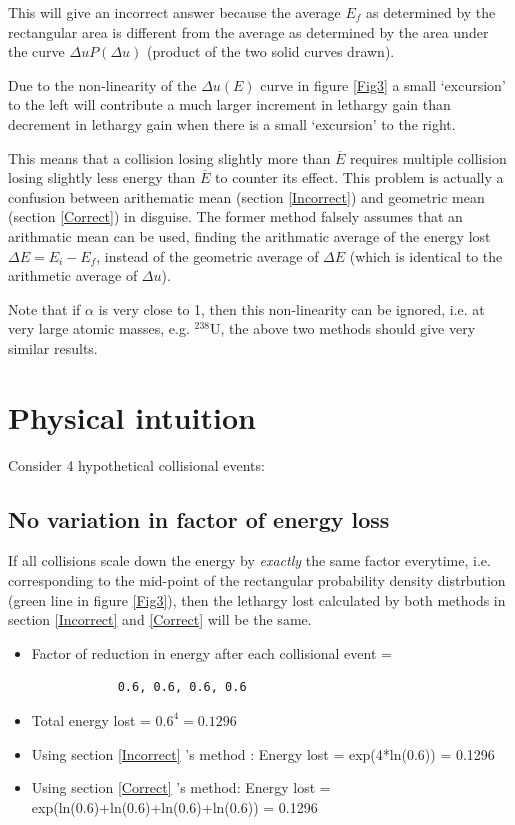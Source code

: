 \documentclass[a4paper, 12pt]{article}
\begin{document}
	This will give an incorrect answer because the average $E_f$ as determined by the rectangular area is different from the average as determined by the area under the curve $ \Delta u P(\Delta u)$ (product of the two solid curves drawn).

	Due to the non-linearity of the $\Delta u(E)$ curve in figure \ref{Fig3} a small `excursion' to the left will contribute a much larger increment in lethargy gain than decrement in lethargy gain when there is a small `excursion' to the right.
	

	This means that a collision losing slightly more than $\overline{E}$ requires multiple collision losing slightly less energy than $\overline{E}$ to counter its effect.
	This problem is actually a confusion between arithematic mean (section \ref{Incorrect}) and geometric mean (section \ref{Correct}) in disguise. The former method falsely assumes that an arithmatic mean can be used, finding the arithmatic average of the energy lost $\Delta E = E_i-E_f$, instead of the geometric average of $\Delta E$ (which is identical to the arithmetic average of $\Delta u$).

	Note that if $\alpha$ is very close to 1, then this non-linearity can be ignored, i.e. at very large atomic masses, e.g. ${}^{238}$U, the above two methods should give very similar results.

\section{Physical intuition}
	Consider 4 hypothetical collisional events:

	\subsection{No variation in factor of energy loss}
	If all collisions scale down the energy by \emph{exactly} the same factor everytime, i.e. corresponding to the mid-point of the rectangular probability density distrbution (green line in figure \ref{Fig3}), then the lethargy lost calculated by both methods in section \ref{Incorrect} and \ref{Correct} will be the same.
	\begin{itemize}
		\item Factor of reduction in energy after each collisional event = \begin{verbatim}
			0.6, 0.6, 0.6, 0.6
		\end{verbatim}
		\item Total energy lost = $0.6^4 =  0.1296$
		\item Using section \ref{Incorrect} 's method : Energy lost = exp(4*ln(0.6)) = 0.1296
		\item Using section \ref{Correct} 's method: Energy lost = exp(ln(0.6)+ln(0.6)+ln(0.6)+ln(0.6)) = 0.1296
	\end{itemize}
	
\end{document}
